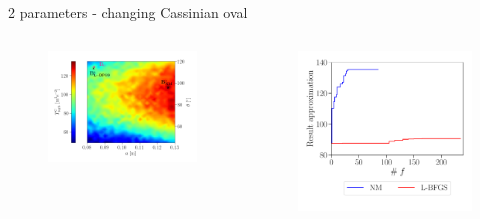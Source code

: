 \documentclass[aspectratio=169,xcolor=dvipsnames]{beamer}
\begin{document}
\begin{frame}{2 parameters - changing Cassinian oval}
	\addtocounter{framenumber}{-1}
	\begin{columns}
		\begin{column}{.55\textwidth}
			\begin{figure}
				\includegraphics[width=1.1\linewidth, trim={0 0 1cm 9mm}, clip]{Images/2full.png}		
			\end{figure}
		\end{column}
		\begin{column}{.45\textwidth}
			\vspace{8mm}
			\begin{figure}
				\includegraphics[width=1.0\linewidth, trim={0 0 0 9mm}, clip]{Images/7.pdf}		

\end{figure}
\end{column}
\end{columns}
\end{frame}
\end{document}

